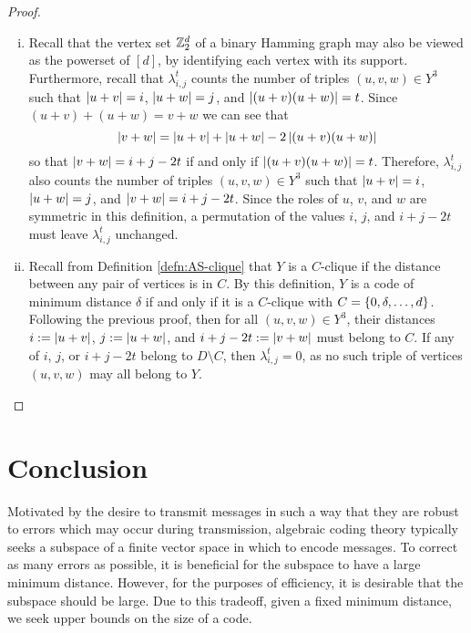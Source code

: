 \documentclass{report}
\newcommand{\wt}[1]{\abs{ #1 }}
\newcommand{\lijt}{\lambda_{i, j}^t}
\begin{document}
\begin{proof}
\begin{enumerate}[(i)]
      \item Recall that the vertex set $\mathbb{Z}_2^d$ of a binary Hamming graph may
        also be viewed as the powerset of $[d]$, by identifying each vertex with
        its support.  Furthermore, recall that $\lijt$ counts the number of
        triples $(u, v, w) \in Y^3$ such that $\wt{u + v} = i$, $\wt{u + w} =
        j$, and $\wt{(u + v)(u + w)} = t$.  Since $(u + v) + (u + w) = v + w$
        we can see that
        $$
          \wt{v + w} = \wt{u + v} + \wt{u + w} - 2\wt{(u + v)(u + w)}
        $$
        so that $\wt{v + w} = i + j - 2t$ if and only if $\wt{(u + v)(u + w)} =
        t$.  Therefore, $\lijt$ also counts the number of triples $(u, v, w) \in
        Y^3$ such that $\wt{u + v} = i$, $\wt{u + w} = j$, and $\wt{v + w} = i +
        j - 2t$.  Since the roles of $u$, $v$, and $w$ are symmetric in this
        definition, a permutation of the values $i$, $j$, and $i + j - 2t$ must
        leave $\lijt$ unchanged.

      \item Recall from Definition \ref{defn:AS-clique} that $Y$ is a
        $C$-clique if the distance between any pair of vertices is in $C$.  By
        this definition, $Y$ is a code of minimum distance $\delta$ if and only
        if it is a $C$-clique with $C = \left\lbrace 0, \delta, \ldots, d \right\rbrace$.  Following
        the previous proof, then for all $(u, v, w) \in Y^3$, their distances
        $i := \wt{u + v}$, $j := \wt{u + w}$, and $i + j - 2t := \wt{v + w}$
        must belong to $C$.  If any of $i$, $j$, or $i + j - 2t$ belong to $D
        \setminus C$, then $\lijt = 0$, as no such triple of vertices $(u, v,
        w)$ may all belong to $Y$.

    \end{enumerate} \end{proof}

\chapter{Conclusion}

  Motivated by the desire to transmit messages in such a way that they are
  robust to errors which may occur during transmission, algebraic coding theory
  typically seeks a subspace of a finite vector space in which to encode
  messages.  To correct as many errors as possible, it is beneficial for the
  subspace to have a large minimum distance.  However, for the purposes of
  efficiency, it is desirable that the subspace should be large.  Due to this
  tradeoff, given a fixed minimum distance, we seek upper bounds on the size of
  a code.
\end{document}
